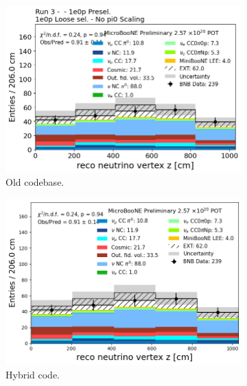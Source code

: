 \begin{figure}[H]
    \centering
    \begin{subfigure}[t]{0.32\linewidth}
        \includegraphics[width=\linewidth]{technote/Appendix_Validation/Figures/1e0p_Loose/Run3_Vertex_Z_Old.png}
        \caption{Old codebase.}
    \end{subfigure}%
    \hspace{0.2cm}%
    \begin{subfigure}[t]{0.32\linewidth}
        \includegraphics[width=\linewidth]{technote/Appendix_Validation/Figures/1e0p_Loose/Run3_Vertex_Z_Chris.png}
        \caption{Hybrid code.}
    \end{subfigure}%
    \hspace{0.2cm}%
    \begin{subfigure}[t]{0.32\linewidth}

\end{subfigure}
\end{figure}
